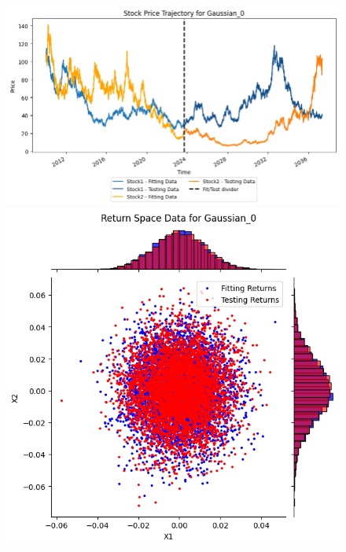 \begin{figure}
    \centering
    \begin{minipage}{0.9\textwidth}
        \centering
        \begin{minipage}{0.54\textwidth}
            \centering
            \includegraphics[width=\textwidth]{4Method/pictures/PricesGaussian_0.png}
        \end{minipage}
        \hfill
        \begin{minipage}{0.34\textwidth}
            \centering
            \includegraphics[width=\textwidth]{4Method/pictures/ReturnsGaussian_0.png}

\end{minipage}
\end{minipage}
\end{figure}
